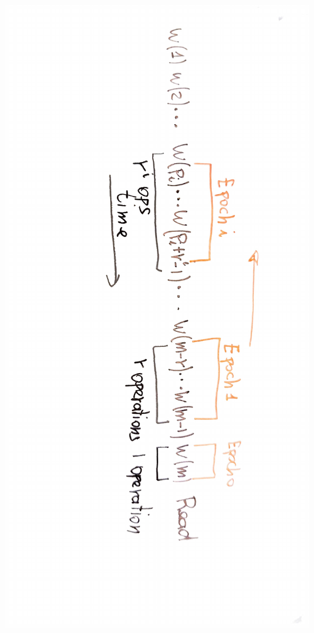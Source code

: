 \documentclass[]{beamer}
\begin{document}
\begin{frame}
\begin{center}
\includegraphics[angle=90,width=\textwidth]{Images/epochs.pdf}
\end{center}

\end{frame}
\end{document}
